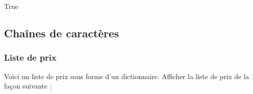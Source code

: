 \documentclass[letterpaper,10pt,english]{sphinxhowto}
\begin{document}
\begin{sphinxVerbatim}[commandchars=\\\{\}]
  
  

 
      
     
         
     
         
      
         
       
         
     
\end{sphinxVerbatim}

\begin{sphinxVerbatim}[commandchars=\\\{\}]
\end{sphinxVerbatim}

\begin{sphinxVerbatim}[commandchars=\\\{\}]
True
\end{sphinxVerbatim}


\subsection{Chaînes de caractères}
\label{\detokenize{cours4_chaine_caractere_corr_exercices:chaines-de-caracteres}}\label{\detokenize{cours4_chaine_caractere_corr_exercices::doc}}

\subsubsection{Liste de prix}
\label{\detokenize{cours4_chaine_caractere_corr_exercices:liste-de-prix}}
\sphinxAtStartPar
Voici un liste de prix sous forme d’un dictionnaire. Afficher la liste de prix de la façon suivante :
\end{document}
